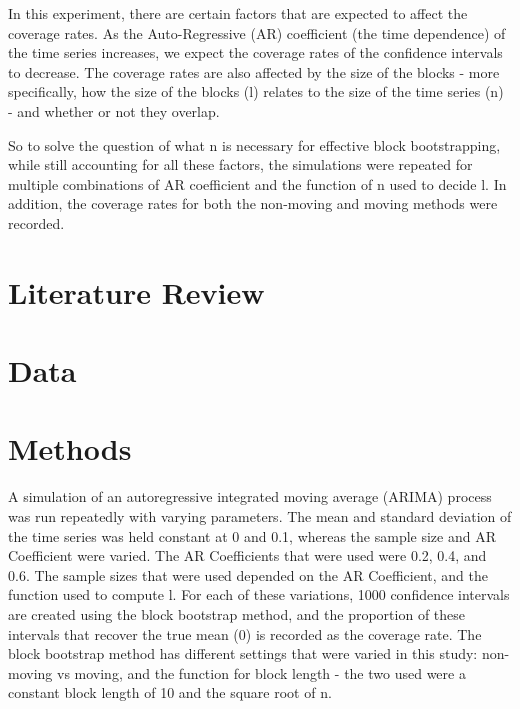 \documentclass[12pt, letterpaper, titlepage]{article}
\begin{document}
In this experiment, there are certain factors that are expected to affect the coverage
rates. As the Auto-Regressive (AR) coefficient (the time dependence) of the time series increases,
we expect the coverage rates of the confidence intervals to decrease.
The coverage rates are also affected by the size of the blocks - more specifically,
how the size of the blocks (l) relates to the size of the time series (n) - 
and whether or not they overlap.

So to solve the question of what n is necessary for effective block bootstrapping,
while still accounting for all these factors, the simulations were repeated for
multiple combinations of AR coefficient and the function of n used to decide l. In addition, the coverage rates
for both the non-moving and moving methods were recorded.

\section{Literature Review}
\label{sec:litreview}




\section{Data}
\label{sec:data}




\section{Methods}
\label{sec:methods}

A simulation of an autoregressive integrated moving average (ARIMA) process was run repeatedly with varying parameters. 
The mean and standard deviation of the time series was held constant at 0 and 0.1, whereas the sample size and AR Coefficient
 were varied. The AR Coefficients that were used were 0.2, 0.4, and 0.6. The sample sizes that were used depended on the AR
 Coefficient, and the function used to compute l. For each of these variations, 1000 confidence intervals are created using
 the block bootstrap method, and the proportion of these intervals that recover the true mean (0) is recorded as the coverage
 rate. The block bootstrap method has different settings that were varied in this study: non-moving vs moving, 
and the function for block length - the two used were a constant block length of 10 and the square root of n.
\end{document}
